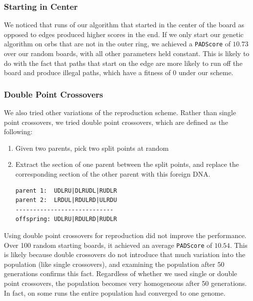 \documentclass[journal,final,letterpaper,11pt]{IEEEtran}
\begin{document}
\subsubsection{Starting in Center} We noticed that runs of our algorithm that started in the center of the board as opposed to edges produced higher scores in the end. If we only start our genetic algorithm on orbs that are not in the outer ring, we achieved a \texttt{PADScore} of $10.73$ over our random boards, with all other parameters held constant. This is likely to do with the fact that paths that start on the edge are more likely to run off the board and produce illegal paths, which have a fitness of $0$ under our scheme.

\subsubsection{Double Point Crossovers} We also tried other variations of the reproduction scheme. Rather than single point crossovers, we tried double point crossovers, which are defined as the following: 

\begin{enumerate}[(i.)]
\item Given two parents, pick two split points at random
\item Extract the section of one parent between the split points, and replace the corresponding section of the other parent with this foreign DNA.
\begin{verbatim}
parent 1:  UDLRU|DLRUDL|RUDLR
parent 2:  LRDUL|RDULRD|ULRDU
----------------------------
offspring: UDLRU|RDULRD|RUDLR
\end{verbatim}
\end{enumerate}
\vspace*{0.1 in}
Using double point crossovers for reproduction did not improve the performance. Over 100 random starting boards, it achieved an average \texttt{PADScore} of $10.54$. This is likely because double crossovers do not introduce that much variation into the population (like single crossovers), and examining the population after 50 generations confirms this fact. Regardless of whether we used single or double point crossovers, the population becomes very homogeneous after 50 generations. In fact, on some runs the entire population had converged to one genome.
\end{document}
